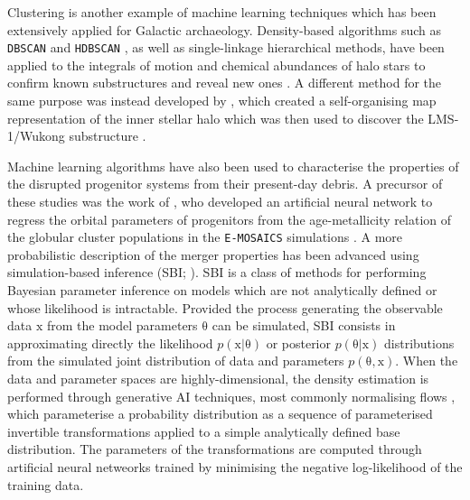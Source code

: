 Clustering is another example of machine learning techniques which has been extensively 
applied for Galactic archaeology. Density-based algorithms 
such as \texttt{DBSCAN} \citep{Ester1996} and \texttt{HDBSCAN} \citep{Campello2013}, 
as well as single-linkage hierarchical methods, have been applied to the integrals of motion and 
chemical abundances of halo stars to confirm known substructures and reveal 
new ones \citep{Koppelman2019,Borsato2020,Lovdal2022,RuizLara2022a,Dodd2023}.
A different method for the same purpose was instead developed by \citet{Yuan2018}, which 
created a self-organising map representation of the inner stellar halo which was then used to
discover the LMS-1/Wukong substructure \citep{Yuan2020}.

Machine learning algorithms have also been used to characterise the properties of the disrupted
progenitor systems from their present-day debris. A precursor of these studies was the 
work of \citet{Kruijssen2020}, who developed an artificial neural network to regress 
the orbital parameters of progenitors from the age-metallicity relation of the
globular cluster populations in the \texttt{E-MOSAICS} simulations \citep{Pfeffer2018}.
A more probabilistic description of the merger properties has been advanced 
using simulation-based inference (SBI; \citealt{Cranmer2020}). 
SBI is a class of methods for performing Bayesian parameter inference on models which are not
analytically defined or whose likelihood is intractable. Provided the process generating the 
observable data $\mathrm{x}$ from the model parameters $\mathrm{\theta}$ can be simulated, 
SBI consists in approximating directly the likelihood $p(\mathrm{x}|\mathrm{\theta})$ or posterior $p(\mathrm{\theta}|\mathrm{x})$ 
distributions from the simulated joint distribution of data and parameters $p(\mathrm{\theta},\mathrm{x})$. 
When the data and parameter spaces are highly-dimensional, the density estimation is performed through 
generative AI techniques, most commonly normalising flows \citep{Papamakarios2017},
which parameterise a probability distribution as a sequence of parameterised invertible 
transformations applied to a simple analytically defined base distribution. The parameters of the 
transformations are computed through artificial neural netweorks trained by 
minimising the negative log-likelihood of the training data. 

